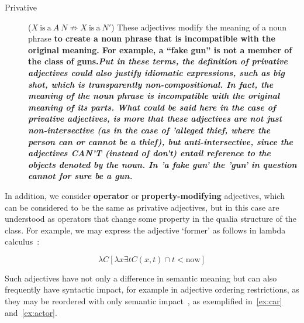 \documentclass[11pt]{article}
\begin{document}
\begin{description}
\item[Privative] ($X\mathrm{~is~a~}A~N \not\Rightarrow X\mathrm{~is~a~}N'$) 
These adjectives modify the meaning of a noun phrase \textbf{to create a noun phrase 
that is incompatible with the original meaning. For example, a 
``fake gun'' is not a member of the class of guns.\textit{Put in these terms, the definition of privative adjectives could also justify idiomatic expressions, such as big shot, which is transparently non-compositional. In fact, the meaning of the noun phrase is incompatible with the original meaning of its parts. What could be said here in the case of privative adjectives, is more that these adjectives are not just non-intersective (as in the case of 'alleged thief, where the person can or cannot be a thief), but anti-intersective, since the adjectives CAN'T (instead of don't) entail reference to the objects denoted by the noun. In 'a fake gun' the 'gun' in question cannot for sure be a gun.}}
\end{description}

In addition, we consider \textbf{operator} or \textbf{property-modifying} adjectives, 
which can be considered to be the same as privative adjectives, but in this 
case are understood as operators that change some property in the qualia 
structure of the class. For example, we may express the adjective `former' 
as follows in lambda calculus~\cite{partee2003there}:

$$\lambda C [\lambda x \exists t C(x,t) \cap t < \mathrm{now}]$$

Such adjectives have not only a difference in semantic meaning but can also 
frequently have syntactic impact, for example in adjective ordering 
restrictions, as they may be reordered with only semantic 
impact~\cite{teodorescu2006adjective}, as exemplified in~\ref{ex:car} and~\ref{ex:actor}.
\end{document}
